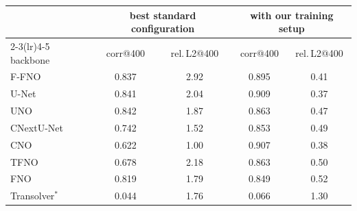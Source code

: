 \begin{tabular}{lcccc}
\toprule
 & \multicolumn{2}{c}{best standard configuration} & \multicolumn{2}{c}{with our training setup} \\
\cmidrule(lr){2-3}\cmidrule(lr){4-5}
backbone & corr@400 & rel.\,L2@400 & corr@400 & rel.\,L2@400 \\
\midrule
F-FNO & 0.837 & 2.92 & 0.895 & 0.41 \\
U-Net & 0.841 & 2.04 & 0.909 & 0.37 \\
UNO & 0.842 & 1.87 & 0.863 & 0.47 \\
CNextU-Net & 0.742 & 1.52 & 0.853 & 0.49 \\
CNO & 0.622 & 1.00 & 0.907 & 0.38 \\
TFNO & 0.678 & 2.18 & 0.863 & 0.50 \\
FNO & 0.819 & 1.79 & 0.849 & 0.52 \\
Transolver$^{*}$ & 0.044 & 1.76 & 0.066 & 1.30 \\
\bottomrule
\end{tabular}